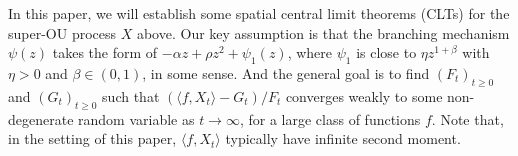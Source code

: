 \documentclass[12pt,a4paper]{amsart}
\theoremstyle{plain}
\theoremstyle{definition}
\numberwithin{equation}{section}
\begin{document}
In this paper, we will establish some spatial central limit theorems (CLTs) for the super-OU process $X$ above.
Our key assumption is that the branching mechanism $\psi(z)$ takes the form of $-\alpha z +\rho z^2+ \psi_1(z)$, where $\psi_1$ is close to $\eta z^{1+\beta}$ with $\eta>0$ and $\beta\in (0, 1)$, in some sense.
And the general goal is to find $(F_t)_{t\geq 0}$ and $(G_t)_{t\geq 0}$ such that $ (\langle f, X_t \rangle -G_t)/F_t $ converges weakly to some non-degenerate random variable as $t\rightarrow\infty$, for a large class of functions $f$.
Note that, in the setting of this paper, $\langle f,X_t\rangle$ typically have infinite second moment.
\end{document}

